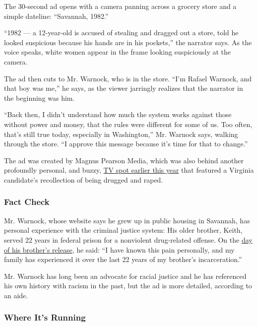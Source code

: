 The 30-second ad opens with a camera panning across a grocery store and
a simple dateline: ``Savannah, 1982.''

``1982 --- a 12-year-old is accused of stealing and dragged out a store,
told he looked suspicious because his hands are in his pockets,'' the
narrator says. As the voice speaks, white women appear in the frame
looking suspiciously at the camera.

The ad then cuts to Mr. Warnock, who is in the store. ``I'm Rafael
Warnock, and that boy was me,'' he says, as the viewer jarringly
realizes that the narrator in the beginning was him.

``Back then, I didn't understand how much the system works against those
without power and money, that the rules were different for some of us.
Too often, that's still true today, especially in Washington,'' Mr.
Warnock says, walking through the store. ``I approve this message
because it's time for that to change.''

The ad was created by Magnus Pearson Media, which was also behind
another profoundly personal, and buzzy,
\href{https://www.nytimes3xbfgragh.onion/2020/05/21/us/politics/claire-russo-ad.html}{TV
spot earlier this year} that featured a Virginia candidate's
recollection of being drugged and raped.

\hypertarget{fact-check}{%
\subsubsection{Fact Check}\label{fact-check}}

Mr. Warnock, whose website says he grew up in public housing in
Savannah, has personal experience with the criminal justice system: His
older brother, Keith, served 22 years in federal prison for a nonviolent
drug-related offense. On the
\href{https://www.ajc.com/blog/politics/today-have-hope-warnock-brother-released-from-prison/nZK2GyWgbdZHLDCOx3MQ9N/}{day
of his brother's release}, he said: ``I have known this pain personally,
and my family has experienced it over the last 22 years of my brother's
incarceration.''

Mr. Warnock has long been an advocate for racial justice and he has
referenced his own history with racism in the past, but the ad is more
detailed, according to an aide.

\hypertarget{where-its-running}{%
\subsubsection{Where It's Running}\label{where-its-running}}

